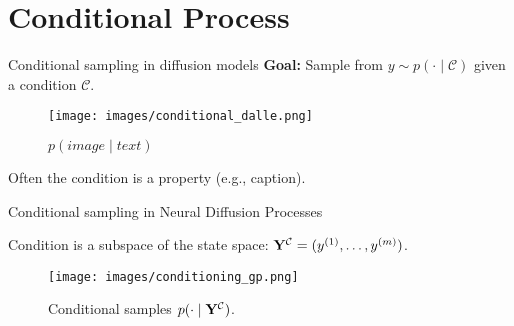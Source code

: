 

\section{Conditional Process}

\begin{frame}{Conditional sampling in diffusion models}
\textbf{Goal:} Sample from $y \sim p(\cdot \mid \mathcal{C})$ given a condition $\mathcal{C}$.\\
\pause
\begin{figure}
\centering
\texttt{[image: images/conditional\_dalle.png]}
\caption{$p(image \mid text)$}
\end{figure}
Often the condition is a property (e.g., caption).
\end{frame}

\begin{frame}{Conditional sampling in Neural Diffusion Processes}

Condition is a subspace of the state space: $\mathbf{Y}^\mathcal{C} = (y^{(1)}, \ldots, y^{(m)})$.
\begin{figure}
\centering
\texttt{[image: images/conditioning\_gp.png]}
\caption{Conditional samples $p(\cdot \mid \mathbf{Y}^\mathcal{C})$.}
\end{figure}
\end{frame}

